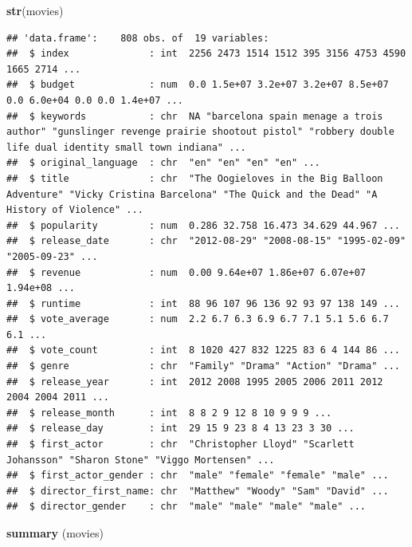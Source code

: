 \documentclass[
]{article}
\newenvironment{Shaded}{\begin{snugshade}}{\end{snugshade}}
\newcommand{\FunctionTok}[1]{\textcolor[rgb]{0.13,0.29,0.53}{\textbf{#1}}}
\newcommand{\NormalTok}[1]{#1}
\begin{document}
\begin{Shaded}
\begin{Highlighting}[]
\FunctionTok{str}\NormalTok{(movies)}
\end{Highlighting}
\end{Shaded}

\begin{verbatim}
## 'data.frame':    808 obs. of  19 variables:
##  $ index              : int  2256 2473 1514 1512 395 3156 4753 4590 1665 2714 ...
##  $ budget             : num  0.0 1.5e+07 3.2e+07 3.2e+07 8.5e+07 0.0 6.0e+04 0.0 0.0 1.4e+07 ...
##  $ keywords           : chr  NA "barcelona spain menage a trois author" "gunslinger revenge prairie shootout pistol" "robbery double life dual identity small town indiana" ...
##  $ original_language  : chr  "en" "en" "en" "en" ...
##  $ title              : chr  "The Oogieloves in the Big Balloon Adventure" "Vicky Cristina Barcelona" "The Quick and the Dead" "A History of Violence" ...
##  $ popularity         : num  0.286 32.758 16.473 34.629 44.967 ...
##  $ release_date       : chr  "2012-08-29" "2008-08-15" "1995-02-09" "2005-09-23" ...
##  $ revenue            : num  0.00 9.64e+07 1.86e+07 6.07e+07 1.94e+08 ...
##  $ runtime            : int  88 96 107 96 136 92 93 97 138 149 ...
##  $ vote_average       : num  2.2 6.7 6.3 6.9 6.7 7.1 5.1 5.6 6.7 6.1 ...
##  $ vote_count         : int  8 1020 427 832 1225 83 6 4 144 86 ...
##  $ genre              : chr  "Family" "Drama" "Action" "Drama" ...
##  $ release_year       : int  2012 2008 1995 2005 2006 2011 2012 2004 2004 2011 ...
##  $ release_month      : int  8 8 2 9 12 8 10 9 9 9 ...
##  $ release_day        : int  29 15 9 23 8 4 13 23 3 30 ...
##  $ first_actor        : chr  "Christopher Lloyd" "Scarlett Johansson" "Sharon Stone" "Viggo Mortensen" ...
##  $ first_actor_gender : chr  "male" "female" "female" "male" ...
##  $ director_first_name: chr  "Matthew" "Woody" "Sam" "David" ...
##  $ director_gender    : chr  "male" "male" "male" "male" ...
\end{verbatim}

\begin{Shaded}
\begin{Highlighting}[]
\FunctionTok{summary}\NormalTok{ (movies)}
\end{Highlighting}
\end{Shaded}
\end{document}
